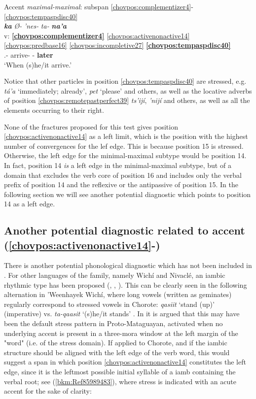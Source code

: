 \documentclass[output=paper]{langscibook}
\begin{document}
\ea\label{bkm:Ref85988661}Accent \textit{maximal-maximal}: subspan \ref{chovpos:complementizer4}{}-\ref{chovpos:tempaspdisc40}\\
\glll {} \textbf{\textit{ka}} \textit{Ø{}-} \textit{'nes{}-} \textit{ta{}-} \textbf{\textit{na'a}} \\
v: \textbf{\ref{chovpos:complementizer4}} \ref{chovpos:activenonactive14} \ref{chovpos:predbase16} \ref{chovpos:incompletive27} \textbf{\ref{chovpos:tempaspdisc40}} \\ 
{} \textbf{\Comp{}} \Third.\Irr{}- arrive- \Incomp{}- \textbf{later} \\
\glt `When (s)he/it arrive.'
\z 


Notice that other particles in position \ref{chovpos:tempaspdisc40} are stressed, e.g. \textit{tá'a} `immediately; already', \textit{pet} `please' and others, as well as the locative adverbs of position \ref{chovpos:remotepastperfect39} \textit{ts'ijí}, \textit{'nijí} and others, as well as all the elements occurring to their right.

None of the fractures proposed for this test gives position \ref{chovpos:activenonactive14} as a left limit, which is the position with the highest number of convergences for the lef edge. This is because position 15 is stressed. Otherwise, the left edge for the minimal-maximal subtype would be position 14. In fact, position 14 \textit{is} a left edge in the minimal-maximal subtype, but of a domain that excludes the verb core of position 16 and includes only the verbal prefix of position 14 and the reflexive or the antipassive of position 15. In the following section we will see another potential diagnostic which points to position 14 as a left edge.

\subsection{Another potential diagnostic related to accent (\ref{chovpos:activenonactive14}{}-)}

There is another potential phonological diagnostic which has not been included in . For other languages of the family, namely Wichí and Nivaclé, an iambic rhythmic type has been proposed (\citealt{Nercesian2014}, \citealt{Gutierrez2015}, \citealt{Gutierrez2016}). This can be clearly seen in the following alternation in 'Weenhayek Wichí, where long vowels (written as geminates) regularly correspond to stressed vowels in Chorote: \textit{qasiit} `stand (up)' (imperative) vs. \textit{ta-qaasit} `(s)he/it stands' \citep{Claesson2016}. In \citet{NikulinCarolForthcoming} it is argued that this may have been the default stress pattern in Proto-Mataguayan, activated when no underlying accent is present in a three-mora window at the left margin of the "word" (i.e. of the stress domain). If applied to Chorote, and if the iambic structure should be aligned with the left edge of the verb word, this would suggest a span in which position \ref{chovpos:activenonactive14} constitutes the left edge, since it is the leftmost possible initial syllable of a iamb containing the verbal root; see (\ref{bkm:Ref85989483}), where stress is indicated with an acute accent for the sake of clarity:
\end{document}
